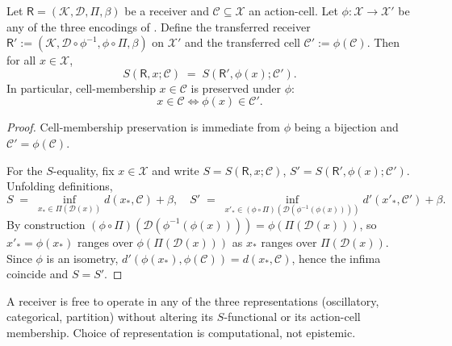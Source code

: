\documentclass[twocolumn,11pt,a4paper]{article}
\newcommand{\K}{\mathcal{K}}
\newcommand{\D}{\mathcal{D}}
\newcommand{\X}{\mathcal{X}}
\newcommand{\Cell}{\mathcal{C}}
\newcommand{\receiver}{\mathsf{R}}
\begin{document}
\begin{theorem}\label{thm:rep-inv}
Let $\receiver=(\K,\D,\Pi,\beta)$ be a receiver and $\Cell\subseteq\X$ an
action-cell. Let $\phi:\X\to\X'$ be any of the three encodings of
. Define the transferred receiver
$\receiver':=(\K,\D\circ\phi^{-1},\phi\circ\Pi,\beta)$ on $\X'$ and the
transferred cell $\Cell':=\phi(\Cell)$. Then for all $x\in\X$,
\[
S(\receiver,x;\Cell)\;=\;S(\receiver',\phi(x);\Cell').
\]
In particular, cell-membership $x\in\Cell$ is preserved under $\phi$:
\[
x\in\Cell \iff \phi(x)\in\Cell'.
\]
\end{theorem}

\begin{proof}
Cell-membership preservation is immediate from $\phi$ being a bijection and
$\Cell'=\phi(\Cell)$.

For the $S$-equality, fix $x\in\X$ and write $S=S(\receiver,x;\Cell)$,
$S'=S(\receiver',\phi(x);\Cell')$. Unfolding definitions,
\[
S\;=\;\inf_{x_*\in\Pi(\D(x))}d(x_*,\Cell)+\beta,
\quad
S'\;=\;\inf_{x'_*\in(\phi\circ\Pi)(\D(\phi^{-1}(\phi(x))))}d'(x'_*,\Cell')+\beta.
\]
By construction $(\phi\circ\Pi)(\D(\phi^{-1}(\phi(x))))=\phi(\Pi(\D(x)))$,
so $x'_*=\phi(x_*)$ ranges over $\phi(\Pi(\D(x)))$ as $x_*$ ranges over
$\Pi(\D(x))$. Since $\phi$ is an isometry,
$d'(\phi(x_*),\phi(\Cell))=d(x_*,\Cell)$, hence the infima coincide and
$S=S'$.
\end{proof}

\begin{corollary}\label{cor:triple}
A receiver is free to operate in any of the three representations
(oscillatory, categorical, partition) without altering its $S$-functional
or its action-cell membership. Choice of representation is computational,
not epistemic.
\end{corollary}
\end{document}
